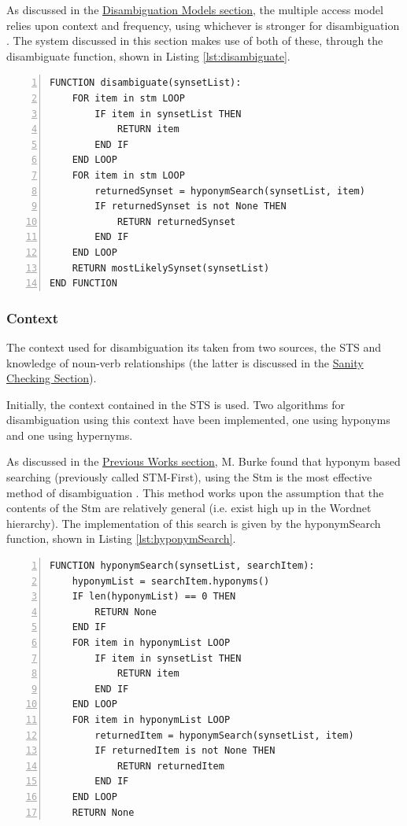 \documentclass[]{article}
\begin{document}
As discussed in the \hyperref[sec:DisambiguationModels]{Disambiguation Models section}, the multiple access model relies upon context and frequency, using whichever is stronger for disambiguation \cite{PsychologyOfLanguage}. The system discussed in this section makes use of both of these, through the disambiguate function, shown in Listing \ref{lst:disambiguate}.

\begin{lstlisting}[numbers=left, numberstyle=\small, caption={The disambiguate function}, captionpos=b, label={lst:disambiguate}]
FUNCTION disambiguate(synsetList):
    FOR item in stm LOOP
        IF item in synsetList THEN
            RETURN item
        END IF
    END LOOP
    FOR item in stm LOOP
        returnedSynset = hyponymSearch(synsetList, item)
        IF returnedSynset is not None THEN
            RETURN returnedSynset
        END IF
    END LOOP
    RETURN mostLikelySynset(synsetList)
END FUNCTION
\end{lstlisting}

\subsubsection{Context}
\label{sec:DisambiguationContext}
The context used for disambiguation its taken from two sources, the STS and knowledge of noun-verb relationships (the latter is discussed in the \hyperref[Sanity]{Sanity Checking Section}).

Initially, the context contained in the STS is used. Two algorithms for disambiguation using this context have been implemented, one using hyponyms and one using hypernyms.

As discussed in the \hyperref[sec:MattBurke]{Previous Works section}, M. Burke found that hyponym based searching (previously called STM-First), using the Stm is the most effective method of disambiguation \cite{MattBurkePrevious}. This method works upon the assumption that the contents of the Stm are relatively general (i.e. exist high up in the Wordnet hierarchy). The implementation of this search is given by the hyponymSearch function, shown in Listing \ref{lst:hyponymSearch}.

\begin{lstlisting}[numbers=left, numberstyle=\small, caption={The hyponymSearch function}, captionpos=b, label={lst:hyponymSearch}]
FUNCTION hyponymSearch(synsetList, searchItem):
    hyponymList = searchItem.hyponyms()
    IF len(hyponymList) == 0 THEN
        RETURN None
    END IF
    FOR item in hyponymList LOOP
        IF item in synsetList THEN
            RETURN item
        END IF
    END LOOP
    FOR item in hyponymList LOOP
        returnedItem = hyponymSearch(synsetList, item)
        IF returnedItem is not None THEN
            RETURN returnedItem
        END IF
    END LOOP
    RETURN None
\end{lstlisting}
\end{document}
